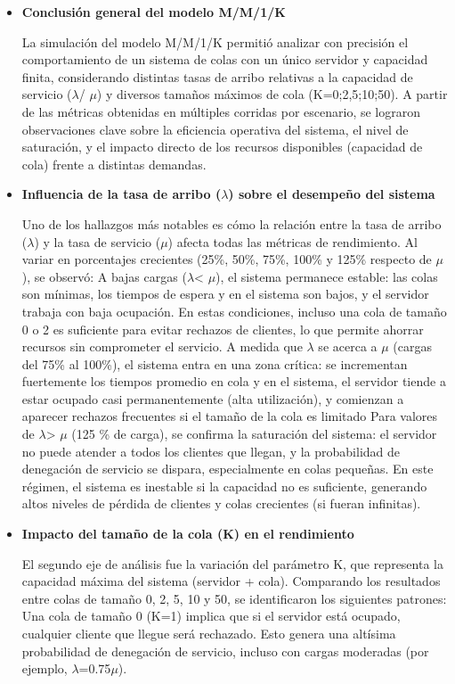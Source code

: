 \documentclass[12pt]{article}
\begin{document}
\begin{itemize}
    \item \textbf{Conclusión general del modelo M/M/1/K}\par
    La simulación del modelo M/M/1/K permitió analizar con precisión el comportamiento de un sistema de colas con un único servidor y capacidad finita, considerando distintas tasas de arribo relativas a la capacidad de servicio (\(\lambda\)/ \(\mu\)) y diversos tamaños máximos de cola (K=0;2,5;10;50). A partir de las métricas obtenidas en múltiples corridas por escenario, se lograron observaciones clave sobre la eficiencia operativa del sistema, el nivel de saturación, y el impacto directo de los recursos disponibles (capacidad de cola) frente a distintas demandas.
    \item \textbf{Influencia de la tasa de arribo (\(\lambda\)) sobre el desempeño del sistema}\par
    Uno de los hallazgos más notables es cómo la relación entre la tasa de arribo (\(\lambda\)) y la tasa de servicio (\(\mu\)) afecta todas las métricas de rendimiento. Al variar en porcentajes crecientes (25\%, 50\%, 75\%, 100\% y 125\% respecto de \(\mu\)), se observó:
    A bajas cargas (\(\lambda\)< \(\mu\)), el sistema permanece estable: las colas son mínimas, los tiempos de espera y en el sistema son bajos, y el servidor trabaja con baja ocupación. En estas condiciones, incluso una cola de tamaño 0 o 2 es suficiente para evitar rechazos de clientes, lo que permite ahorrar recursos sin comprometer el servicio.
    A medida que \(\lambda\) se acerca a \(\mu\) (cargas del 75\% al 100\%), el sistema entra en una zona crítica: se incrementan fuertemente los tiempos promedio en cola y en el sistema, el servidor tiende a estar ocupado casi permanentemente (alta utilización), y comienzan a aparecer rechazos frecuentes si el tamaño de la cola es limitado
    Para valores de \(\lambda\)> \(\mu\) (125 \% de carga), se confirma la saturación del sistema: el servidor no puede atender a todos los clientes que llegan, y la probabilidad de denegación de servicio se dispara, especialmente en colas pequeñas. En este régimen, el sistema es inestable si la capacidad no es suficiente, generando altos niveles de pérdida de clientes y colas crecientes (si fueran infinitas).
    \item \textbf{Impacto del tamaño de la cola (K) en el rendimiento}\par
    El segundo eje de análisis fue la variación del parámetro K, que representa la capacidad máxima del sistema (servidor + cola). Comparando los resultados entre colas de tamaño 0, 2, 5, 10 y 50, se identificaron los siguientes patrones:
    Una cola de tamaño 0 (K=1) implica que si el servidor está ocupado, cualquier cliente que llegue será rechazado. Esto genera una altísima probabilidad de denegación de servicio, incluso con cargas moderadas (por ejemplo, \(\lambda\)=0.75\(\mu\)).


\end{itemize}
\end{document}
